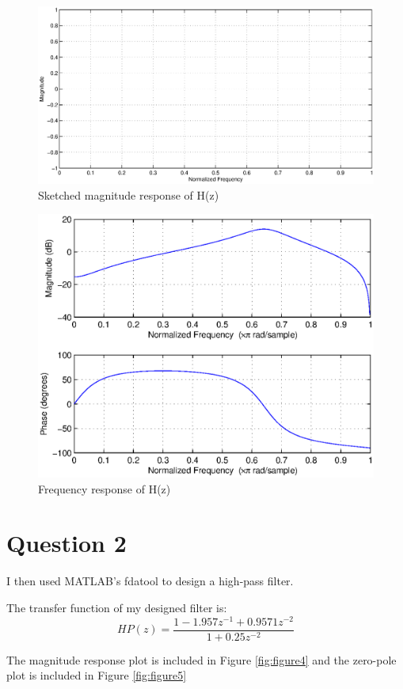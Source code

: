 \documentclass{article}
\begin{document}
\begin{figure}[htp]
	\begin{center}
		\includegraphics [width=6.0in]{sketch.eps}
		\caption{Sketched magnitude response of H(z)}
		\label{fig:figure2}
	\end{center}
\end{figure}

\begin{figure}[htp]
	\begin{center}
		\includegraphics [width=6.0in]{freqz.eps}
		\caption{Frequency response of H(z)}
		\label{fig:figure3}
	\end{center}
\end{figure}

\section*{Question 2}
\begin{par}
I then used MATLAB's fdatool to design a high-pass filter.

The transfer function of my designed filter is:
$$HP(z) = \frac{1 - 1.957z^{-1} + 0.9571z^{-2}}{1 + 0.25z^{-2}}$$

The magnitude response plot is included in Figure \ref{fig:figure4} and the zero-pole plot is included in Figure \ref{fig:figure5}
\end{par}
\end{document}
